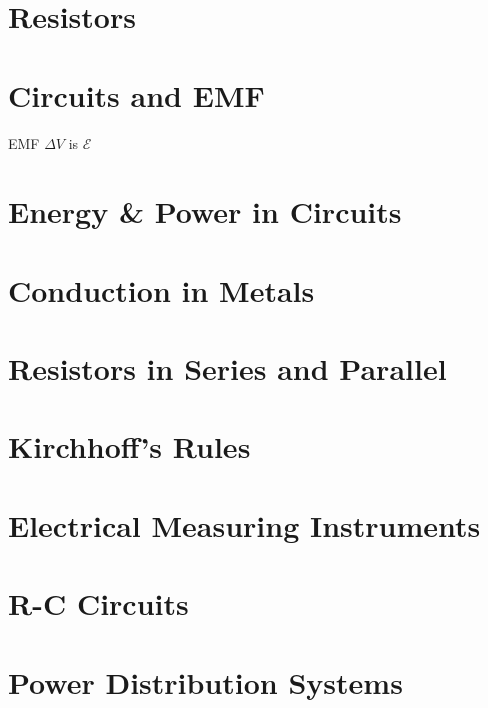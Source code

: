 \documentclass[10pt, a4paper, twocolumn]{article}
\begin{document}
    \section{Resistors}	
        
    \section{Circuits and EMF}	
        EMF $\Delta V$ is $\mathcal{E}$
    \section{Energy \& Power in Circuits}	
    \section{Conduction in Metals}	
    \section{Resistors in Series and Parallel}
    \section{Kirchhoff's Rules}
    \section{Electrical Measuring Instruments}
    \section{R-C Circuits}
    \section{Power Distribution Systems}
\end{document}
